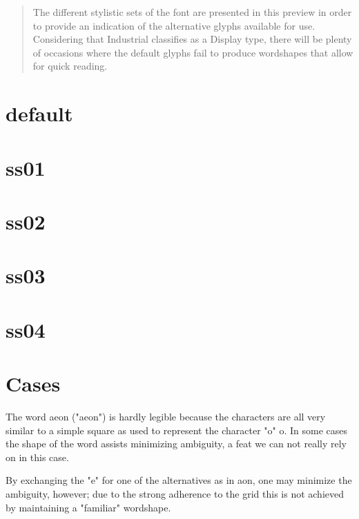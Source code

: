 \documentclass[a4paper]{article}
\begin{document}
\title{}
\author{}
\maketitle
\begin{abstract}
  The different stylistic sets of the font are presented in this preview in order to provide an indication of the alternative glyphs available for use.
  Considering that Industrial classifies as a Display type, there will be plenty of occasions where the default glyphs fail to produce wordshapes that allow for quick reading.
\end{abstract}


\newpage
\section{default}
{\ssdefault }

\newpage
\section{ss01}
{\ssone }

\newpage
\section{ss02}
{\sstwo }

\newpage
\section{ss03}
{\ssthree }

\newpage
\section{ss04}
{\ssfour }


\newpage
\section{Cases}
The word {\ssdefault aeon} ("aeon") is hardly legible because the characters are all very
similar to a simple square as used to represent the character "o" {\ssdefault o}. In some
cases the shape of the word assists minimizing ambiguity, a feat we can not really rely on
in this case.

By exchanging the "e" for one of the alternatives as in {\ssdefault aon}, one may
minimize the ambiguity, however; due to the strong adherence to the grid this is not achieved
by maintaining a "familiar" wordshape.
\end{document}
